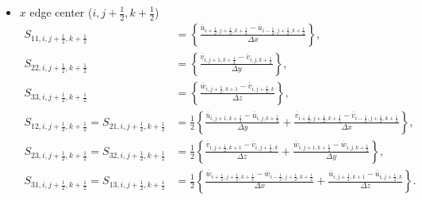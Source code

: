 \begin{itemize}
  \item $x$ edge center ($i,j+\frac{1}{2},k+\frac{1}{2}$)
    \begin{align}
      S_{11,i,j+\frac{1}{2},k+\frac{1}{2}} &= \left\{
      \frac{\overline{u}_{i+\frac{1}{2},j+\frac{1}{2},k+\frac{1}{2}}-\overline{u}_{i-\frac{1}{2},j+\frac{1}{2},k+\frac{1}{2}}}{\Delta x}
      \right\}, \\
      S_{22,i,j+\frac{1}{2},k+\frac{1}{2}} &= \left\{
      \frac{\overline{v}_{i,j+1,k+\frac{1}{2}}-\overline{v}_{i,j,k+\frac{1}{2}}}{\Delta y}
      \right\}, \\
      S_{33,i,j+\frac{1}{2},k+\frac{1}{2}} &= \left\{
      \frac{\overline{w}_{i,j+\frac{1}{2},k+1}-\overline{v}_{i,j+\frac{1}{2},k}}{\Delta z}
      \right\}, \\
      S_{12,i,j+\frac{1}{2},k+\frac{1}{2}} = S_{21,i,j+\frac{1}{2},k+\frac{1}{2}} &= \frac{1}{2}\left\{
      \frac{\overline{u}_{i,j+1,k+\frac{1}{2}}-\overline{u}_{i,j,k+\frac{1}{2}}}{\Delta y}
     +\frac{\overline{v}_{i+\frac{1}{2},j+\frac{1}{2},k+\frac{1}{2}}-\overline{v}_{i-\frac{1}{2},j+\frac{1}{2},k+\frac{1}{2}}}{\Delta x}
      \right\}, \\
      S_{23,i,j+\frac{1}{2},k+\frac{1}{2}} = S_{32,i,j+\frac{1}{2},k+\frac{1}{2}} &= \frac{1}{2}\left\{
      \frac{\overline{v}_{i,j+\frac{1}{2},k+1}-\overline{v}_{i,j+\frac{1}{2},k}}{\Delta z}
     +\frac{\overline{w}_{i,j+1,k+\frac{1}{2}}-\overline{w}_{i,j,k+\frac{1}{2}}}{\Delta y}
      \right\}, \\
      S_{31,i,j+\frac{1}{2},k+\frac{1}{2}} = S_{13,i,j+\frac{1}{2},k+\frac{1}{2}} &= \frac{1}{2}\left\{
      \frac{\overline{w}_{i+\frac{1}{2},j+\frac{1}{2},k+\frac{1}{2}}-\overline{w}_{i-\frac{1}{2},j+\frac{1}{2},k+\frac{1}{2}}}{\Delta x}
     +\frac{\overline{u}_{i,j+\frac{1}{2},k+1}-\overline{u}_{i,j+\frac{1}{2},k}}{\Delta z}
      \right\}.
    \end{align}


\end{itemize}
